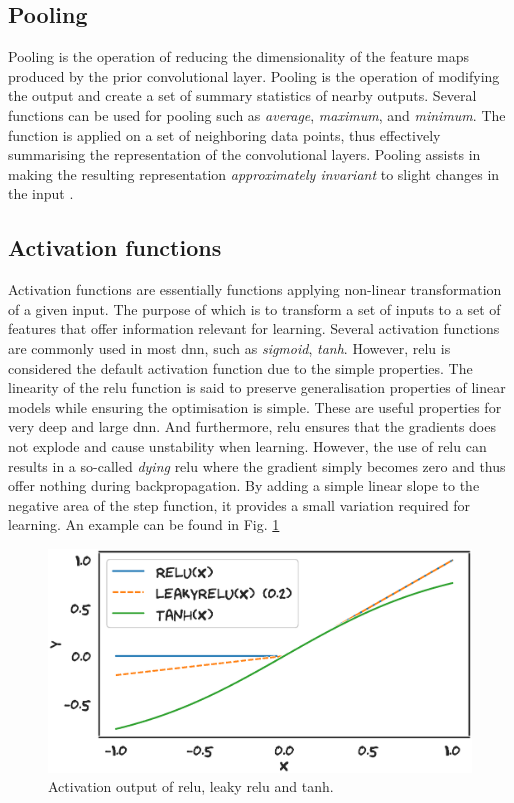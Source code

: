 \subsection{Pooling}
Pooling is the operation of reducing the dimensionality of the feature maps produced by the prior convolutional layer. Pooling is the operation of modifying the output and create a set of summary statistics of nearby outputs. Several functions can be used for pooling such as \emph{average}, \emph{maximum}, and \emph{minimum}. The function is applied on a set of neighboring data points, thus effectively summarising the representation of the convolutional layers. Pooling assists in making the resulting representation \emph{approximately invariant} to slight changes in the input \cite{Goodfellow-et-al-2016}.


\subsection{Activation functions}
Activation functions are essentially functions applying non-linear transformation of a given input. The purpose of which is to transform a set of inputs to a set of features that offer information relevant for learning. Several activation functions are commonly used in most \gls{dnn}, such as \emph{sigmoid}, \emph{tanh}. However, \gls{relu} is considered the default activation function due to the simple properties. The linearity of the \gls{relu} function is said to preserve generalisation properties of linear models while ensuring the optimisation is simple. These are useful properties for very deep and large \gls{dnn}. And furthermore, \gls{relu} ensures that the gradients does not explode and cause unstability when learning. However, the use of \gls{relu} can results in a so-called \emph{dying} \gls{relu} where the gradient simply becomes zero and thus offer nothing during backpropagation. By adding a simple linear slope to the negative area of the step function, it provides a small variation required for learning. An example can be found in Fig. \ref{fig:leakyrelu}

\begin{figure}
    \centering
    \includegraphics[width=\textwidth]{chapters/figures/relu_leakyrelu_example.eps}
    \caption{Activation output of \gls{relu}, leaky \gls{relu} and tanh.}
    \label{fig:leakyrelu}
\end{figure}


